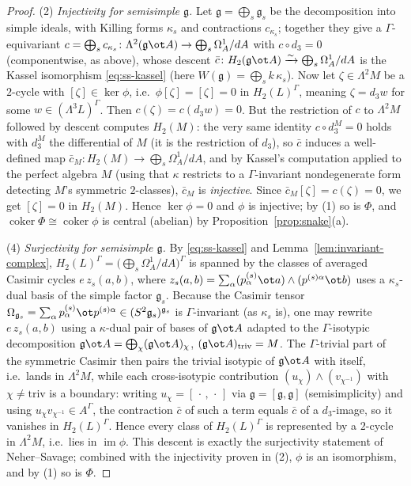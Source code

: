 \documentclass{amsart}
\theoremstyle{definition}
\DeclareMathOperator{\im}{im}
\newcommand{\g}{\mathfrak{g}}
\newcommand{\Om}{\Omega}
\newcommand{\Gm}{\Gamma}
\newcommand{\ra}{\rightarrow}
\begin{document}
\begin{proof}
\smallskip
(2) \emph{Injectivity for semisimple $\g$.}  Let $\g=\bigoplus_{s}\g_s$ be the
decomposition into simple ideals, with Killing forms $\kappa_s$ and contractions
$c_{\kappa_s}$; together they give a $\Gm$-equivariant
$c=\bigoplus_s c_{\kappa_s}\colon\Lambda^2(\g\ot A)\ra\bigoplus_s\Om^1_A/dA$ with
$c\circ d_3=0$ (componentwise, as above), whose descent
$\bar c\colon H_2(\g\ot A)\xrightarrow{\sim}\bigoplus_s\Om^1_A/dA$ is the Kassel
isomorphism \eqref{eq:ss-kassel} (here $W(\g)=\bigoplus_s k\,\kappa_s$).  Now let
$\zeta\in\Lambda^2 M$ be a $2$-cycle with $[\zeta]\in\ker\phi$, i.e.\ $\phi[\zeta]=
[\zeta]=0$ in $H_2(L)^{\Gm}$, meaning $\zeta=d_3 w$ for some
$w\in(\Lambda^3 L)^{\Gm}$.  Then $c(\zeta)=c(d_3 w)=0$.  But the restriction of
$c$ to $\Lambda^2 M$ followed by descent computes $H_2(M)$:  the very same
identity $c\circ d_3^M=0$ holds with $d_3^M$ the differential of $M$ (it is the
restriction of $d_3$), so $\bar c$ induces a well-defined map
$\bar c_M\colon H_2(M)\to\bigoplus_s\Om^1_A/dA$, and by Kassel's computation
applied to the perfect algebra $M$ (using that $\kappa$ restricts to a
$\Gm$-invariant nondegenerate form detecting $M$'s symmetric $2$-classes),
$\bar c_M$ is \emph{injective}.  Since $\bar c_M[\zeta]=c(\zeta)=0$, we get
$[\zeta]=0$ in $H_2(M)$.  Hence $\ker\phi=0$ and $\phi$ is injective; by (1) so is
$\Phi$, and $\operatorname{coker}\Phi\cong\operatorname{coker}\phi$ is central
(abelian) by Proposition~\ref{prop:snake}(a).

\smallskip
(4) \emph{Surjectivity for semisimple $\g$.}  By \eqref{eq:ss-kassel} and
Lemma~\ref{lem:invariant-complex}, $H_2(L)^{\Gm}=\bigl(\bigoplus_s\Om^1_A/dA\bigr)^{\Gm}$
is spanned by the classes of averaged Casimir cycles $e\,z_s(a,b)$, where
$z_s(a,b)=\sum_\alpha(p_\alpha^{(s)}\ot a)\wedge(p^{(s)\alpha}\ot b)$ uses a
$\kappa_s$-dual basis of the simple factor $\g_s$.  Because the Casimir tensor
$\Omega_{\g_s}=\sum_\alpha p^{(s)}_\alpha\ot p^{(s)\alpha}\in(S^2\g_s)^{\g_s}$ is
$\Gm$-invariant (as $\kappa_s$ is), one may rewrite $e\,z_s(a,b)$ using a
$\kappa$-dual pair of bases of $\g\ot A$ adapted to the $\Gm$-isotypic
decomposition $\g\ot A=\bigoplus_\chi(\g\ot A)_\chi$, $(\g\ot A)_{\mathrm{triv}}=M$.
The $\Gm$-trivial part of the symmetric Casimir then pairs the trivial isotypic of
$\g\ot A$ with itself, i.e.\ lands in $\Lambda^2 M$, while each cross-isotypic
contribution $(u_\chi)\wedge(v_{\chi^{-1}})$ with $\chi\ne\mathrm{triv}$ is a
boundary: writing $u_\chi=[\,\cdot\,,\,\cdot\,]$ via $\g=[\g,\g]$ (semisimplicity)
and using $u_\chi v_{\chi^{-1}}\in A^{\Gm}$, the contraction $\bar c$ of such a
term equals $\bar c$ of a $d_3$-image, so it vanishes in $H_2(L)^{\Gm}$.  Hence
every class of $H_2(L)^{\Gm}$ is represented by a $2$-cycle in $\Lambda^2 M$, i.e.\
lies in $\im\phi$.  This descent is exactly the surjectivity statement of
Neher--Savage; combined with the injectivity proven in (2), $\phi$ is an
isomorphism, and by (1) so is $\Phi$.


\end{proof}
\end{document}
